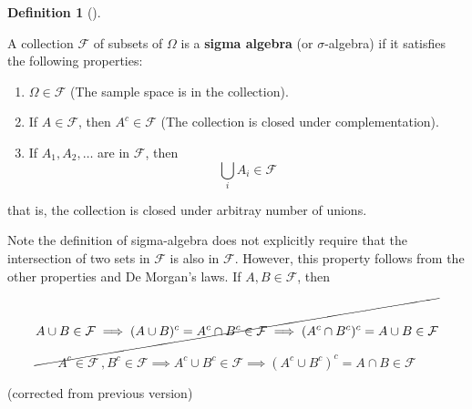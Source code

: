 \documentclass[
  letterpaper,
  DIV=11,
  numbers=noendperiod]{scrreport}
\providecommand{\tightlist}{%
  \setlength{\itemsep}{0pt}\setlength{\parskip}{0pt}}
\theoremstyle{definition}
\theoremstyle{plain}
\theoremstyle{plain}
\theoremstyle{definition}
\newtheorem{definition}{Definition}[chapter]
\theoremstyle{remark}
\begin{document}
\begin{tcolorbox}[enhanced jigsaw, opacitybacktitle=0.6, bottomtitle=1mm, opacityback=0, toprule=.15mm, colbacktitle=quarto-callout-note-color!10!white, colback=white, left=2mm, title={Sigma Algebra}, breakable, rightrule=.15mm, leftrule=.75mm, titlerule=0mm, colframe=quarto-callout-note-color-frame, arc=.35mm, coltitle=black, toptitle=1mm, bottomrule=.15mm]

\begin{definition}[]\protect\hypertarget{def-sigma-algebra}{}\label{def-sigma-algebra}

A collection \(\mathcal{F}\) of subsets of \(\Omega\) is a \textbf{sigma
algebra} (or \(\sigma\)-algebra) if it satisfies the following
properties:

\begin{enumerate}
\def\labelenumi{\arabic{enumi}.}
\tightlist
\item
  \(\Omega \in \mathcal{F}\) (The sample space is in the collection).
\item
  If \(A \in \mathcal{F}\), then \(A^c \in \mathcal{F}\) (The collection
  is closed under complementation).
\item
  If \(A_1, A_2, \dots\) are in \(\mathcal{F}\), then \[
  \bigcup_i A_i \in \mathcal{F}
  \]
\end{enumerate}

that is, the collection is closed under arbitray number of unions.

\end{definition}

\end{tcolorbox}

Note the definition of sigma-algebra does not explicitly require that
the intersection of two sets in \(\mathcal F\) is also in
\(\mathcal F\). However, this property follows from the other properties
and De Morgan's laws. If \(A,B \in \mathcal F\), then

\[
\cancel{A\cup B \in \mathcal F \implies (A\cup B)^c = A^c \cap B^c \in \mathcal F \implies (A^c \cap B^c)^c = A \cup B \in \mathcal F}
\]

\[
A^c \in \mathcal F\,,B^c \in \mathcal F
\implies A^c \cup B^c \in \mathcal F
\implies (A^c \cup B^c)^c= A \cap B\in \mathcal F
\]

(corrected from previous version)
\end{document}
